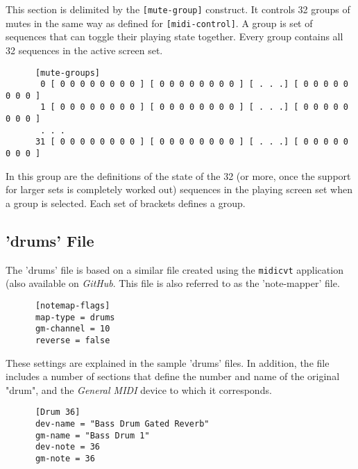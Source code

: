    This section is delimited by the \texttt{[mute-group]} construct.
   It controls 32 groups of mutes in the same way as defined for
   \texttt{[midi-control]}. A group is set of sequences that can toggle their
   playing state together.  Every group contains all 32 sequences in the
   active screen set.

   \begin{verbatim}
      [mute-groups]
       0 [ 0 0 0 0 0 0 0 0 ] [ 0 0 0 0 0 0 0 0 ] [ . . .] [ 0 0 0 0 0 0 0 0 ]
       1 [ 0 0 0 0 0 0 0 0 ] [ 0 0 0 0 0 0 0 0 ] [ . . .] [ 0 0 0 0 0 0 0 0 ]
       . . .
      31 [ 0 0 0 0 0 0 0 0 ] [ 0 0 0 0 0 0 0 0 ] [ . . .] [ 0 0 0 0 0 0 0 0 ]
   \end{verbatim}

   In this group are the definitions of the state of the 32 (or more, once the
   support for larger sets is completely worked out) sequences
   in the playing screen set when a group is selected.
   Each set of brackets defines a group.
%

\subsection{'drums' File}
\label{subsec:configuration_drums}

   The 'drums' file is based on a similar file created using the \texttt{midicvt}
   application (also available on \textsl{GitHub}.
   This file is also referred to as the 'note-mapper' file.

   \begin{verbatim}
      [notemap-flags]
      map-type = drums
      gm-channel = 10
      reverse = false
   \end{verbatim}

   These settings are explained in the sample 'drums' files.  In addition, the file
   includes a number of sections that define the number and name of the
   original "drum", and the \textsl{General MIDI} device to which it corresponds.

   \begin{verbatim}
      [Drum 36]
      dev-name = "Bass Drum Gated Reverb"
      gm-name = "Bass Drum 1"
      dev-note = 36
      gm-note = 36
   \end{verbatim}

